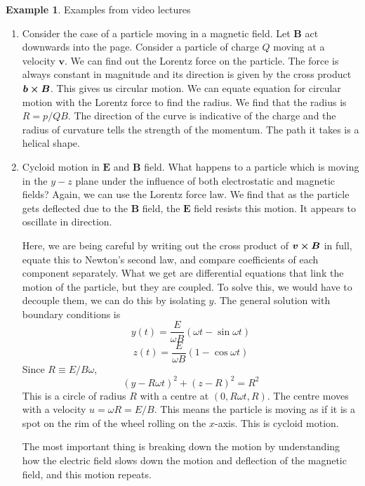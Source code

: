 \documentclass[12pt,chapterprefix=false,dvipsnames]{scrbook}
\theoremstyle{dotless}
\theoremstyle{definition}
\newtheorem{protoexample}{Example}[section]
\newenvironment{example}
{\colorlet{shadecolor}{red!15}\begin{shaded}\begin{protoexample}}
			{\end{protoexample}\end{shaded}}
\def\vec#1{{\ensuremath{\bm{{#1}}}}}
\begin{document}
\begin{example}
	Examples from video lectures
	\begin{enumerate}
		\item Consider the case of a particle moving in a magnetic field. Let
		      $\bm{B}$ act downwards into the page. Consider a
		      particle of charge $Q$ moving at a velocity
		      $\vec{v}$. We can find out the Lorentz force on
		      the particle. The force is always constant in magnitude and its
		      direction is given by the cross product $\bm{b}\cross\bm{B}$.
		      This gives us circular motion. We can equate equation for
		      circular motion with the Lorentz force to find the radius. We
		      find that the radius is $R = p/QB$. The direction
		      of the curve is indicative of the charge and the radius of
		      curvature tells the strength of the momentum. The path it takes
		      is a helical shape.
		\item Cycloid motion in $\bm{E}$ and
		      $\bm{B}$ field. What happens to a particle which
		      is moving in the $y-z$ plane under the
		      influence of both electrostatic and magnetic fields? Again, we
		      can use the Lorentz force law. We find that as the particle gets
		      deflected due to the $\bm{B}$ field, the
		      $\bm{E}$ field resists this motion. It appears to
		      oscillate in direction.

		      Here, we are being careful by writing out the cross product of
		      $\bm{v}\cross\bm{B}$ in full, equate this to Newton's second
		      law, and compare coefficients of each component separately. What
		      we get are differential equations that link the motion of the
		      particle, but they are coupled. To solve this, we would have to
		      decouple them, we can do this by isolating
		      $y$. The general solution with boundary
		      conditions is
		      \begin{equation}
			      y\left(t\right) = \frac{E}{\omega B}
			      \left(\omega t - \sin\omega t \right)
		      \end{equation}
		      \begin{equation}
			      z\left(t\right) = \frac{E}{\omega B}
			      \left(1 - \cos{\omega t}\right)
		      \end{equation}
		      Since $R\equiv E/B\omega$,
		      \begin{equation}
			      {\left(y - R \omega t\right)}^2 + {\left(z - R \right)}^2 = R^2
		      \end{equation}
		      This is a circle of radius $R$ with a centre
		      at $\left(0, R\omega t, R \right)$. The centre moves with a velocity
		      $u = \omega R = E/B$. This means the particle is moving as if
		      it is a spot on the rim of the wheel rolling on the
		      $x$-axis. This is cycloid motion.

		      The most important thing is breaking down the motion by
		      understanding how the electric field slows down the motion and
		      deflection of the magnetic field, and this motion repeats.
	\end{enumerate}
\end{example}
\end{document}
